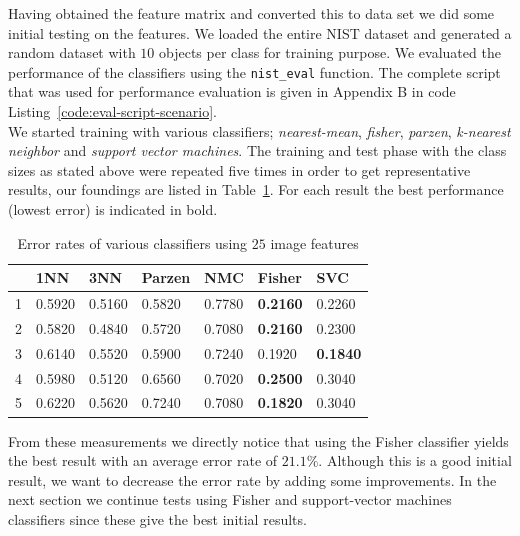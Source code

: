 \documentclass{article}
\begin{document}
Having obtained the feature matrix and converted this to data set we did some initial testing on the features. We loaded the entire NIST dataset and generated a random dataset with $10$ objects per class for training purpose. We evaluated the performance of the classifiers using the \texttt{nist\_eval} function. The complete script that was used for performance evaluation is given in Appendix B in code Listing~\ref{code:eval-script-scenario}. \\

We started training with various classifiers; \emph{nearest-mean}, \emph{fisher}, \emph{parzen}, \emph{k-nearest neighbor} and \emph{support vector machines}. The training and test phase with the class sizes as stated above were repeated five times in order to get representative results, our foundings are listed in Table~\ref{table:results-only-features}. For each result the best performance (lowest error) is indicated in bold. 

\begin{table}[H]
	\centering
    \begin{tabular}{|l|llllll|}
    \hline
	& \textbf{1NN} & \textbf{3NN} & \textbf{Parzen} & \textbf{NMC} & \textbf{Fisher} & \textbf{SVC} \\
	\hline
1 & 0.5920    & 0.5160    & 0.5820    & 0.7780 & \textbf{0.2160}   & 0.2260 \\
2 & 0.5820    & 0.4840    & 0.5720    & 0.7080 & \textbf{0.2160}   & 0.2300 \\
3 & 0.6140    & 0.5520    & 0.5900    & 0.7240 & 0.1920   & \textbf{0.1840} \\
4 & 0.5980    & 0.5120    & 0.6560    & 0.7020 & \textbf{0.2500}   & 0.3040 \\
5 & 0.6220    & 0.5620    & 0.7240    & 0.7080 & \textbf{0.1820}   & 0.3040 \\
	\hline
    \end{tabular}
    \caption{Error rates of various classifiers using $25$ image features \label{table:results-only-features}}
\end{table}

\clearpage

From these measurements we directly notice that using the Fisher classifier yields the best result with an average error rate of $21.1\%$. Although this is a good initial result, we want to decrease the error rate by adding some improvements. In the next section we continue tests using Fisher and support-vector machines classifiers since these give the best initial results.
\end{document}
